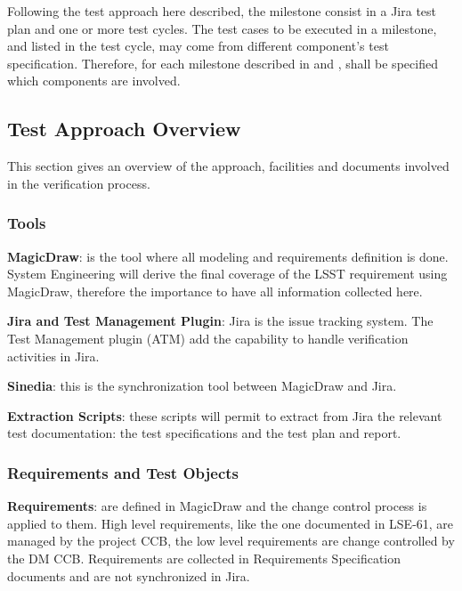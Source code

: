 

Following the test approach here described, the milestone consist in a Jira test plan and one or more test cycles.
The test cases to be executed in a milestone, and listed in the test cycle, may come from different component's test specification.
Therefore, for each milestone described in  and , shall be specified which components are involved.

\subsection{Test Approach Overview}\label{sect:tsform}

This section gives an overview of the approach, facilities and documents involved in the verification process.


\subsubsection{Tools}

{\bf MagicDraw}: is the tool where all modeling and requirements definition is done. System Engineering will derive the final coverage of the LSST requirement using MagicDraw, therefore the importance to have all information collected here.

{\bf Jira and Test Management Plugin}: Jira is the issue tracking system. The Test Management plugin (ATM) add the capability to handle verification activities in Jira.

{\bf Sinedia}: this is the synchronization tool between MagicDraw and Jira.

{\bf Extraction Scripts}: these scripts will permit to extract from Jira the relevant test documentation: the test specifications and the test plan and report.


\subsubsection{Requirements and Test Objects}

{\bf Requirements}: are defined in MagicDraw and the change control process is applied to them. High level requirements, like the one documented in LSE-61, are managed by the project CCB, the low level requirements are change controlled by the DM CCB.
Requirements are collected in Requirements Specification documents and  are not synchronized in Jira.

